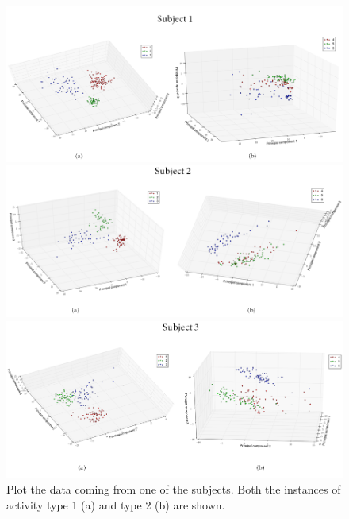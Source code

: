 \documentclass [a4paper] {report}
\begin{document}
	\begin{figure}[H]
		\begin{center}
			\includegraphics[scale=0.6]{Images/subject1.png}
		\end{center}

		\begin{center}
			\includegraphics[scale=0.6]{Images/subject2.png}
		\end{center}

		\begin{center}
			\includegraphics[scale=0.6]{Images/subject3.png}
		\end{center}
		\caption{Plot the data coming from one of the subjects. Both the instances of activity type 1 (a) and type 2 (b) are shown.}
		\label{subjects}
	\end{figure}
	
\end{document}
